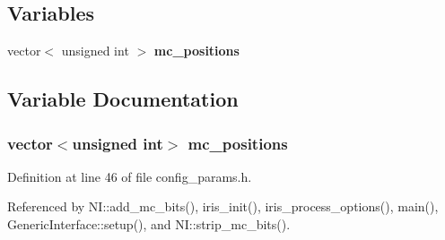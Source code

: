 \subsection*{Variables}
\begin{CompactItemize}
\item 
vector$<$ unsigned int $>$ {\bf mc\_\-positions}
\end{CompactItemize}


\subsection{Variable Documentation}
\subsubsection[{mc\_\-positions}]{\setlength{\rightskip}{0pt plus 5cm}vector$<$unsigned int$>$ {\bf mc\_\-positions}}\label{mesh_8h_a632410576eb044c5236f3aad1607e33}




Definition at line 46 of file config\_\-params.h.

Referenced by NI::add\_\-mc\_\-bits(), iris\_\-init(), iris\_\-process\_\-options(), main(), GenericInterface::setup(), and NI::strip\_\-mc\_\-bits().